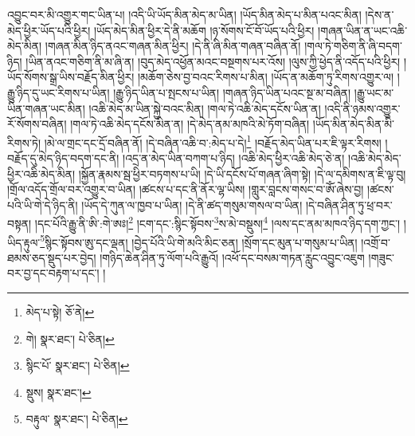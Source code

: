 འབྱུང་བར་མི་འགྱུར་གང་ཡིན་པ། །འདི་ཡི་ཡོད་མིན་མེད་མ་ཡིན། །ཡོད་མིན་མེད་པ་མིན་པའང་མིན། །དེས་ན་མེད་ཕྱིར་ཡོད་པའི་ཕྱིར། །ཡོད་མེད་མིན་ཕྱིར་དེ་ནི་མཆོག །ཉ་སོགས་ངོ་བོ་ཡོད་པའི་ཕྱིར། །གཞན་ཡིན་ན་ཡང་འཆི་མེད་མིན། །གཞན་མིན་ཉིད་ནའང་གཞན་མིན་ཕྱིར། །དེ་ནི་ཞི་མིན་གཞན་བཞིན་ནོ། །གལ་ཏེ་གཅིག་ནི་ཞི་བདག་ཉིད། །ཡིན་ནའང་གཅིག་ནི་མ་ཞི་ན། །བུད་མེད་འཕྱོན་མའང་བསྔགས་པར་འོས། །ལུས་ཀྱི་ཕྱེད་ནི་འདོད་པའི་ཕྱིར། །ཡོད་སོགས་སྒྲ་ཡིས་བརྗོད་མིན་ཕྱིར། །མཆོག་ཅེས་བྱ་བའང་རིགས་པ་མིན། །ཡོད་ན་མཆོག་ཏུ་རིགས་འགྱུར་ལ། །རྒྱུ་ཉིད་དུ་ཡང་རིགས་པ་ཡིན། །རྒྱུ་ཉིད་ཡིན་པ་སྤངས་པ་ཡིན། །གཞན་ཉིད་ཡིན་པའང་སྔ་མ་བཞིན། །རྒྱུ་ཡང་མ་ཡིན་གཞན་ཡང་མིན། །འཆི་མེད་མ་ཡིན་སྐྱེ་བའང་མིན། །གལ་ཏེ་འཆི་མེད་དངོས་ཡིན་ན། །འདི་ནི་ཉམས་འགྱུར་རོ་སོགས་བཞིན། །གལ་ཏེ་འཆི་མེད་དངོས་མིན་ན། །དེ་མེད་ནམ་མཁའི་མེ་ཏོག་བཞིན། །ཡོད་མིན་མེད་མིན་མི་རིགས་ཏེ། །མེ་ལ་གྲང་དང་དྲོ་བཞིན་ནོ། །དེ་བཞིན་འཆི་བ་:མེད་པ་དེ།\footnote{མེད་པ་སྟེ།  ཅོ་ནེ། } །བརྗོད་མེད་ཡིན་པར་ཇི་ལྟར་རིགས། །བརྗོད་དུ་མེད་ཉིད་བདག་དང་ནི། །འདྲ་ན་མེད་ཡིན་བཀག་པ་ཉིད། །འཆི་མེད་ཕྱིར་འཆི་མེད་ཅེ་ན། །འཆི་མེད་མེད་ཕྱིར་འཆི་མེད་མིན། །སྐྱོན་རྣམས་སྦ་ཕྱིར་བཏགས་པ་ཡི། །དེ་ཡི་དངོས་པོ་གཞན་ཞིག་སྟེ། །དེ་ལ་དམིགས་ན་ཇི་ལྟ་བུ། །གྲོལ་འདོད་གྲོལ་བར་འགྱུར་བ་ཡིན། །ཚངས་པ་དང་ནི་ནོར་ལྷ་ཡིས། །གླུར་བླངས་གསང་བ་ཨོཾ་ཞེས་བྱ། །ཚངས་པའི་ཡི་གེ་དེ་ཉིད་ནི། །ཡོད་དེ་ཀུན་ལ་ཁྱབ་པ་ཡིན། །དེ་ནི་ཚད་གསུམ་གསལ་བ་ཡིན། །དེ་བཞིན་ཤིན་ཏུ་ཕྲ་བར་བསྟན། །དང་པོའི་རྒྱུ་ནི་ཨི་:གེ་ཨཿ།\footnote{གེ།  སྣར་ཐང་།  པེ་ཅིན། } །ངག་དང་:སྙིང་སྟོབས་\footnote{སྙིང་པོ་  སྣར་ཐང་།  པེ་ཅིན། }ས་མེ་བསྡུས།\footnote{སྡུས།  སྣར་ཐང་། } །ལས་དང་ནམ་མཁའ་ཉིད་དག་ཀྱང་། །ཡིད་རྟུལ་\footnote{བརྟུལ་  སྣར་ཐང་།  པེ་ཅིན། }སྙིང་སྟོབས་ཨུ་དང་ལྡན། །བྱེད་པོའི་ཡི་གེ་མའི་མིང་ཅན། །སྲོག་དང་མུན་པ་གསུམ་པ་ཡིན། །འགྲོ་བ་ཐམས་ཅད་སྡུད་པར་བྱེད། །གཉིད་ཆེན་ཤིན་ཏུ་ལོག་པའི་རྒྱུའོ། །འཕོ་དང་བསམ་གཏན་རླུང་འབྱུང་འཇུག །གཟུང་བར་བྱ་དང་བརྟག་པ་དང་། །
